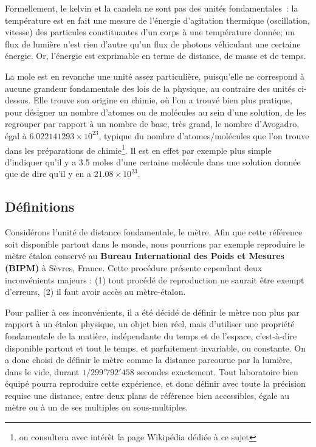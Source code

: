 Formellement, le kelvin et la candela ne sont pas des unités fondamentales~: la température est en fait une mesure de l'énergie d'agitation thermique (oscillation, vitesse) des particules constituantes d'un corps à une température donnée; un flux de lumière n'est rien d'autre qu'un flux de photons véhiculant une certaine énergie. Or, l'énergie est exprimable en terme de distance, de masse et de temps.

La mole est en revanche une unité assez particulière, puisqu'elle ne correspond à aucune grandeur fondamentale des lois de la physique, au contraire des unités ci-dessus. Elle trouve son origine en chimie, où l'on a trouvé bien plus pratique, pour désigner un nombre d'atomes ou de molécules au sein d'une solution, de les regrouper par rapport à un nombre de base, très grand, le nombre d'Avogadro, égal à $6.022141293\times 10^{23}$, typique du nombre d'atomes/molécules que l'on trouve dans les préparations de chimie\footnote{on consultera avec intérêt la page Wikipédia dédiée à ce sujet}. Il est en effet par exemple plus simple d'indiquer qu'il y a 3.5 moles d'une certaine molécule dans une solution donnée que de dire qu'il y en a $21.08\times 10^{23}$.

\subsection{Définitions}

Considérons l'unité de distance fondamentale, le mètre. Afin que cette référence soit disponible partout dans le monde, nous pourrions par exemple reproduire le mètre étalon conservé au \textbf{Bureau International des Poids et Mesures (BIPM)} à Sèvres, France. Cette procédure présente cependant deux inconvénients majeurs : (1) tout procédé de reproduction ne saurait être exempt d'erreurs, (2) il faut avoir accès au mètre-étalon.

Pour pallier à ces inconvénients, il a été décidé de définir le mètre non plus par rapport à un étalon physique, un objet bien réel, mais d'utiliser une propriété fondamentale de la matière, indépendante du temps et de l'espace, c'est-à-dire disponible partout et tout le temps, et parfaitement invariable, ou constante. On a donc choisi de définir le mètre comme la distance parcourue par la lumière, dans le vide, durant $1/299'792'458$ secondes exactement. Tout laboratoire bien équipé pourra reproduire cette expérience, et donc définir avec toute la précision requise une distance, entre deux plans de référence bien accessibles, égale au mètre ou à un de ses multiples ou sous-multiples.

